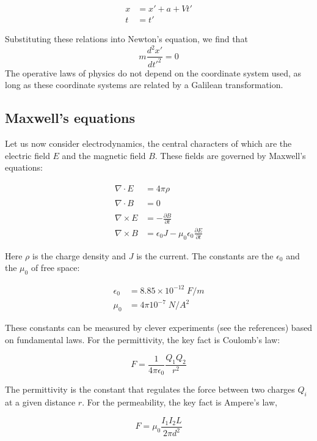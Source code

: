 \begin{align}
  x &= x' + a + Vt' \\
  t &= t'
\end{align}

Substituting these relations into Newton's equation, we find
that
\[
    m\frac{d^2x'}{dt'^2} = 0
\]
The operative laws of physics do not depend on the
coordinate system used, as long as these coordinate
systems are related by a Galilean transformation.


\subsection{Maxwell's equations}

Let us now consider electrodynamics, the central characters
of which are the electric field $E$ and the magnetic field
$B$.  These fields are governed by Maxwell's equations:

\begin{align}
 \nabla\cdot E &= 4\pi\rho \phantom{\frac{2}{2}}\\
 \nabla\cdot B &= 0 \phantom{\frac{2}{2}}\\
 \nabla\times E &= - \frac{\partial B}{\partial t} \\
 \nabla\times B &= \epsilon_0J -\mu_0\epsilon_0\frac{\partial E}{\partial t}
\end{align}

Here $\rho$ is the charge density and $J$ is the current.
The constants are the 
$\epsilon_0$ and the
 $\mu_0$ of  free space:

\begin{align}
\epsilon_0 &= 8.85 \times 10^{-12} \; F/m \\
\mu_0 &= 4\pi 10^{-7} \; N/A^2
\end{align}

These constants can be measured by clever experiments
(see the references) based on fundamental
laws.  For the permittivity, the key fact
 is Coulomb's law:

\begin{equation}
\label{coulombs_law}
  F = \frac{1}{4\pi \epsilon_0} \frac{Q_1Q_2}{r^2}
\end{equation}

The permittivity is the constant that regulates the force
between two charges $Q_i$ at a given distance $r$.   For the permeability,
the key fact is Ampere's law,

\begin{equation}
\label{amperes_law}
  F = \mu_0 \frac{I_1I_2L}{2\pi d^2}
\end{equation}

